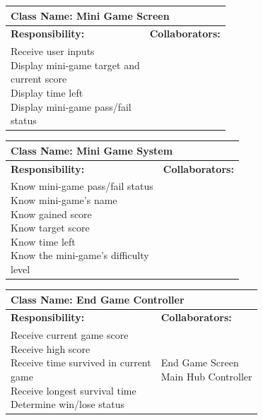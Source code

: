 \documentclass[]{article}
\begin{document}
\begin{table}[H]
	\centering
	\begin{tabular}{|p{5cm}|p{5cm}|}
	\hline 
	\multicolumn{2}{|l|}{\textbf{Class Name: Mini Game Screen}} \\
	\hline
	\textbf{Responsibility:} & \textbf{Collaborators:} \\
	\hline
	

	\makecell[l]{Receive user inputs\\ Display mini-game target and\\current score\\ Display time left\\ Display mini-game pass/fail\\status} & \makecell[c]{Mini Game Controller}\\
	\hline
	\end{tabular}
\end{table}	

\begin{table}[H]
	\centering
	\begin{tabular}{|p{5cm}|p{5cm}|}
	\hline 
	\multicolumn{2}{|l|}{\textbf{Class Name: Mini Game System}} \\
	\hline
	\textbf{Responsibility:} & \textbf{Collaborators:} \\
	\hline
	\makecell[l]{Know mini-game pass/fail status\\Know mini-game's name\\Know gained score\\Know target score\\Know time left\\Know the mini-game's difficulty\\level} & \makecell[c]{
	}\\
	\hline
	\end{tabular}
\end{table}	

\begin{table}[H]
	\centering
	\begin{tabular}{|p{5cm}|p{5cm}|}
	\hline 
	\multicolumn{2}{|l|}{\textbf{Class Name: End Game Controller}} \\
	\hline
	\textbf{Responsibility:} & \textbf{Collaborators:} \\
	\hline
	\makecell[l]{Receive current game score\\Receive high score\\Receive time survived in current \\ game \\Receive longest survival time\\Determine win/lose status} & \makecell[c]{End Game Screen\\Main Hub Controller}\\
	\hline
	\end{tabular}
\end{table}	
\end{document}
